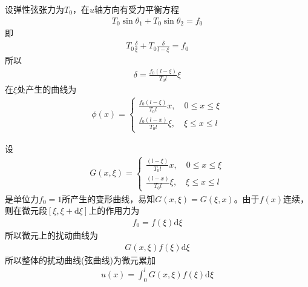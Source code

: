         设弹性弦张力为$T_0$，在$u$轴方向有受力平衡方程
        \begin{align*}
        	T_0 \sin\theta_1 + T_0\sin\theta_2 = f_0
        \end{align*}
        即
        \begin{align*}
        	T_0\frac{\delta}{\xi} + T_0 \frac{\delta}{l - \xi}  =f_0
        \end{align*}
        所以
        \begin{align*}
        	\delta = \frac{f_0 (l - \xi)}{T_0 l}\xi
        \end{align*}
        在$\xi$处产生的曲线为
        \begin{align*}
	        \phi (x) =
	        \left\{
	        	\begin{aligned}
		        	\frac{f_0 (l - \xi)}{T_0 l} x,\quad 0 \leqslant x \leqslant \xi\\
		        	\frac{f_0 (l - x)}{T_0 l} \xi,\quad \xi \leqslant x \leqslant l
	        	\end{aligned}
	        \right.
        \end{align*}
        \par
        设
        \begin{align*}
	        G(x,\xi) =
	        \left\{
	        	\begin{aligned}
		        	\frac{(l - \xi)}{T_0 l} x,\quad 0 \leqslant x \leqslant \xi\\
			        \frac{(l - x)}{T_0 l} \xi,\quad \xi \leqslant x \leqslant l
	        	\end{aligned}
	        \right.
        \end{align*}
        是单位力$f_0 = 1$所产生的变形曲线，易知$G(x,\xi) = G(\xi,x)$。由于$f(x)$连续，则在微元段$[\xi,\xi+\mathrm{d} \xi]$上的作用力为
        \begin{align*}
        	f_0 = f(\xi) \mathrm{d} \xi
        \end{align*}
        所以微元上的扰动曲线为
        \begin{align*}
        	G(x,\xi) f(\xi)\mathrm{d} \xi
        \end{align*}
        所以整体的扰动曲线(弦曲线)为微元累加
        \begin{align}
        	\label{弦振动积分方程}
        	u(x) = \int_0^l G(x,\xi) f(\xi)\mathrm{d} \xi
        \end{align}

